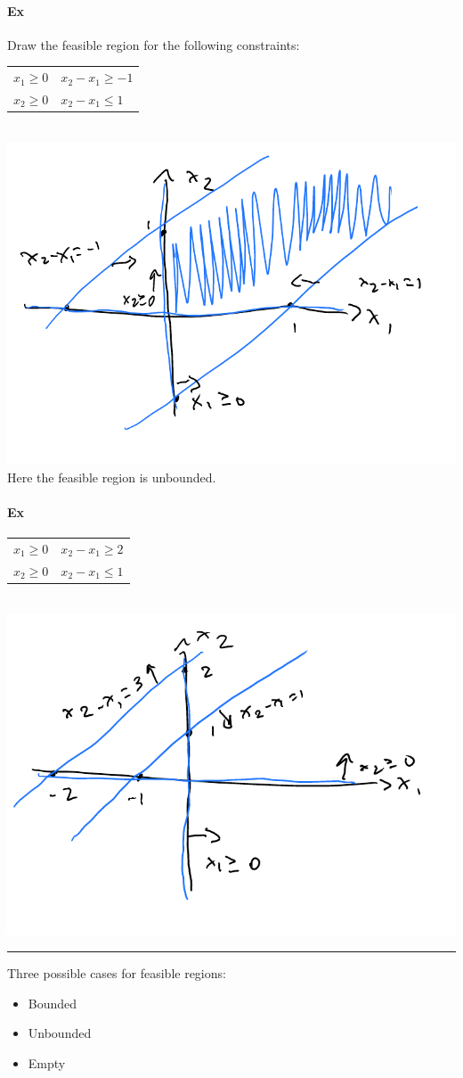 \documentclass[12 pt]{article}
\begin{document}
        \paragraph{Ex} Draw the feasible region for the following
        constraints:
        \\
        \begin{tabular}{l l}
          $x_1 \geq 0$& $x_2 - x_1 \geq -1$
          \\ $x_2 \geq 0$ & $x_2 - x_1 \leq 1$
        \end{tabular}
        \\ \includegraphics[width=.9\textwidth]{i101.pdf}
        Here the feasible region is unbounded.

        \paragraph{Ex}
        \begin{tabular}{l l}
          $x_1 \geq 0$& $x_2 - x_1 \geq 2$
          \\ $x_2 \geq 0$ & $x_2 - x_1 \leq 1$
        \end{tabular}
        \\ \includegraphics[width=.9\textwidth]{i104.pdf}
        \\\noindent \rule{\textwidth}{0.5pt}
        Three possible cases for feasible regions:
        \begin{itemize}
        \item Bounded
        \item Unbounded
        \item Empty
        \end{itemize}
\end{document}
